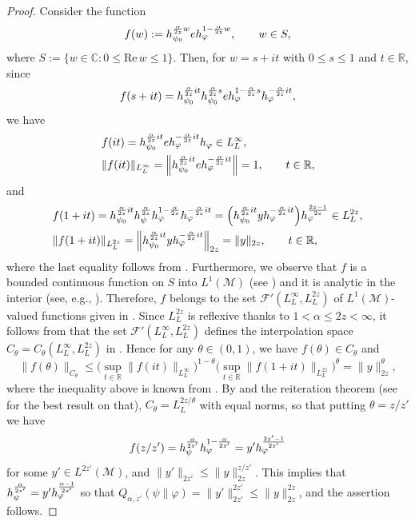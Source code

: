 \documentclass[12pt]{article}
\theoremstyle{definition}
\theoremstyle{remark}
\numberwithin{equation}{section}
\def\Me{\mathcal M}
\def\cF{\mathcal{F}}
\def\ffi{\varphi}
\def\bR{\mathbb{R}}
\def\bC{\mathbb{C}}
\def\Re{\mathrm{Re}\,}
\begin{document}
\begin{proof}
Consider the function
\begin{align}\label{F-6.15}
f(w):=h_{\psi_0}^{{\alpha\over2z}w}eh_\ffi^{1-{\alpha\over2z}w},\qquad w\in S,
\end{align}
where $S:=\{w\in\bC:0\le\Re w\le1\}$. Then, for $w=s+it$ with $0\le s\le1$ and $t\in\bR$, since
\[
f(s+it)=h_{\psi_0}^{{\alpha\over2z}it}h_{\psi_0}^{{\alpha\over2z}s}e
h_\ffi^{1-{\alpha\over2z}s}h_\ffi^{-{\alpha\over2z}it},
\]
we have
\begin{align*}
&f(it)=h_{\psi_0}^{{\alpha\over2z}it}eh_\ffi^{-{\alpha\over2z}it}h_\ffi\in L^\infty_L, \\
&\|f(it)\|_{L^\infty_L}=\Big\|h_{\psi_0}^{{\alpha\over2z}it}eh_\ffi^{-{\alpha\over2z}it}\Big\|=1,
\qquad t\in\bR,
\end{align*}
and
\begin{align*}
&f(1+it)=h_{\psi_0}^{{\alpha\over2z}it}h_\psi^{\alpha\over2z}
h_\ffi^{1-{\alpha\over2z}}h_\ffi^{-{\alpha\over2z}it}
=\Bigl(h_{\psi_0}^{{\alpha\over2z}it}yh_\ffi^{-{\alpha\over2z}it}\Bigr)h_\ffi^{2z-1\over2z}\in L^{2z}_L, \\
&\|f(1+it)\|_{L^{2z}_L}=\Big\|h_{\psi_0}^{{\alpha\over2z}it}yh_\ffi^{-{\alpha\over2z}it}\Big\|_{2z}=\|y\|_{2z},
\qquad t\in\bR,
\end{align*}
where the last equality follows from \cite[Lemma 10.1]{kosaki1984applications}. Furthermore,
we observe that $f$ is a bounded continuous function on $S$ into $L^1(\Me)$
(see \cite[Lemma 10.2]{kosaki1984applications}) and it is analytic in the interior
(see, e.g., \cite[Lemma 9.19 and Theorem 9.18(c)]{hiai2021lectures}). Therefore, $f$ belongs to the
set $\cF'(L^\infty_L,L^{2z}_L)$ of $L^1(\Me)$-valued functions given in
\cite[Definition 1.4]{kosaki1984applications}. Since $L^{2z}_L$ is reflexive thanks to $1<\alpha\le2z<\infty$,
it follows from \cite[Theorems 1.5 and Remark 3.4]{kosaki1984applications} that the set
$\cF'(L^\infty_L,L^{2z}_L)$ defines the interpolation space $C_\theta=C_\theta(L^\infty_L,L^{2z}_L)$ in
\cite[Definition 1.1]{kosaki1984applications}. Hence for any $\theta\in(0,1)$, we have $f(\theta)\in C_\theta$
and
\[
\|f(\theta)\|_{C_\theta}\le\biggl(\sup_{t\in\bR}\|f(it)\|_{L^\infty_L}\biggr)^{1-\theta}
\biggl(\sup_{t\in\bR}\|f(1+it)\|_{L^{2z}_L}\biggr)^\theta=\|y\|_{2z}^\theta,
\]
where the inequality above is known from \cite[Lemma 4.3.2(ii)]{bergh1976interpolation}. By
\cite[Theorem 1.9]{kosaki1984applications} and the reiteration theorem (see
\cite{cwikel1978complex} {for the best result on that}), $C_\theta=L^{2z/\theta}_L$
with equal norms, so that putting $\theta=z/z'$ we have
\[
f(z/z')=h_\psi^{\alpha\over2z'}h_\ffi^{1-{\alpha\over2z'}}=y'h_\ffi^{2z'-1\over2z'}
\]
for some $y'\in L^{2z'}(\Me)$, and $\|y'\|_{2z'}\le\|y\|_{2z}^{z/z'}$. This implies that
$h_\psi^{\alpha\over2z'}=y'h_\ffi^{\alpha-1\over2z'}$ so that
$Q_{\alpha,z'}(\psi\|\ffi)=\|y'\|_{2z'}^{2z'}\le\|y\|_{2z}^{2z}$, and the assertion follows.
\end{proof}
\end{document}
